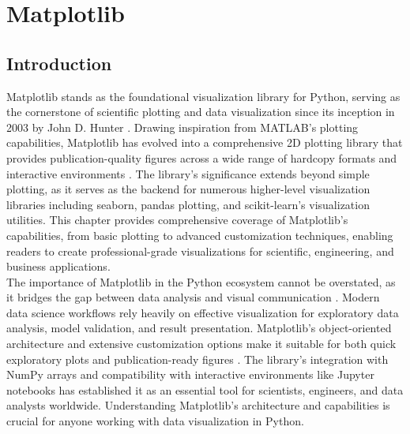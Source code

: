 %
%
%


%
%

\chapter{Matplotlib}
\label{ch:matplotlib}

\section{Introduction}
\label{sec:matplotlib_intro}

Matplotlib stands as the foundational visualization library for Python, serving as the cornerstone of scientific plotting and data visualization since its inception in 2003 by John D. Hunter \cite{Hunter:2007}. Drawing inspiration from MATLAB's plotting capabilities, Matplotlib has evolved into a comprehensive 2D plotting library that provides publication-quality figures across a wide range of hardcopy formats and interactive environments \cite{Matplotlib:2024}. The library's significance extends beyond simple plotting, as it serves as the backend for numerous higher-level visualization libraries including seaborn, pandas plotting, and scikit-learn's visualization utilities. This chapter provides comprehensive coverage of Matplotlib's capabilities, from basic plotting to advanced customization techniques, enabling readers to create professional-grade visualizations for scientific, engineering, and business applications.\\

The importance of Matplotlib in the Python ecosystem cannot be overstated, as it bridges the gap between data analysis and visual communication \cite{VanderPlas:2016}. Modern data science workflows rely heavily on effective visualization for exploratory data analysis, model validation, and result presentation. Matplotlib's object-oriented architecture and extensive customization options make it suitable for both quick exploratory plots and publication-ready figures \cite{Droettboom:2021}. The library's integration with NumPy arrays and compatibility with interactive environments like Jupyter notebooks has established it as an essential tool for scientists, engineers, and data analysts worldwide. Understanding Matplotlib's architecture and capabilities is crucial for anyone working with data visualization in Python.\\

